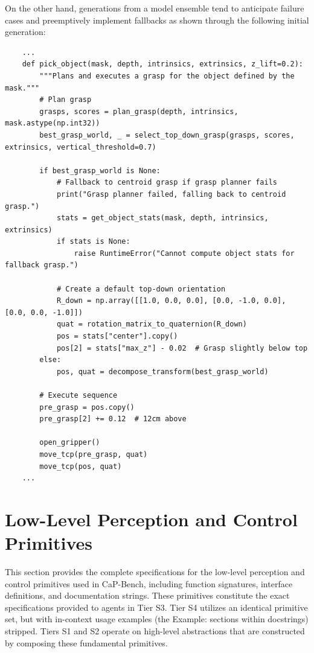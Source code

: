 On the other hand, generations from a model ensemble tend to anticipate failure cases and preemptively implement fallbacks as shown through the following initial generation:

\begin{lstlisting}
    ...
    def pick_object(mask, depth, intrinsics, extrinsics, z_lift=0.2):
        """Plans and executes a grasp for the object defined by the mask."""
        # Plan grasp
        grasps, scores = plan_grasp(depth, intrinsics, mask.astype(np.int32))
        best_grasp_world, _ = select_top_down_grasp(grasps, scores, extrinsics, vertical_threshold=0.7)
        
        if best_grasp_world is None:
            # Fallback to centroid grasp if grasp planner fails
            print("Grasp planner failed, falling back to centroid grasp.")
            stats = get_object_stats(mask, depth, intrinsics, extrinsics)
            if stats is None:
                raise RuntimeError("Cannot compute object stats for fallback grasp.")
            
            # Create a default top-down orientation
            R_down = np.array([[1.0, 0.0, 0.0], [0.0, -1.0, 0.0], [0.0, 0.0, -1.0]])
            quat = rotation_matrix_to_quaternion(R_down)
            pos = stats["center"].copy()
            pos[2] = stats["max_z"] - 0.02  # Grasp slightly below top
        else:
            pos, quat = decompose_transform(best_grasp_world)
        
        # Execute sequence
        pre_grasp = pos.copy()
        pre_grasp[2] += 0.12  # 12cm above
        
        open_gripper()
        move_tcp(pre_grasp, quat)
        move_tcp(pos, quat)
    ...
\end{lstlisting}



\section{Low-Level Perception and Control Primitives}
\label{app:apis}
This section provides the complete specifications for the low-level perception and control primitives used in CaP-Bench, including function signatures, interface definitions, and documentation strings. These primitives constitute the exact specifications provided to agents in Tier S3. Tier S4 utilizes an identical primitive set, but with in-context usage examples (the Example: sections within docstrings) stripped. Tiers S1 and S2 operate on high-level abstractions that are constructed by composing these fundamental primitives.

